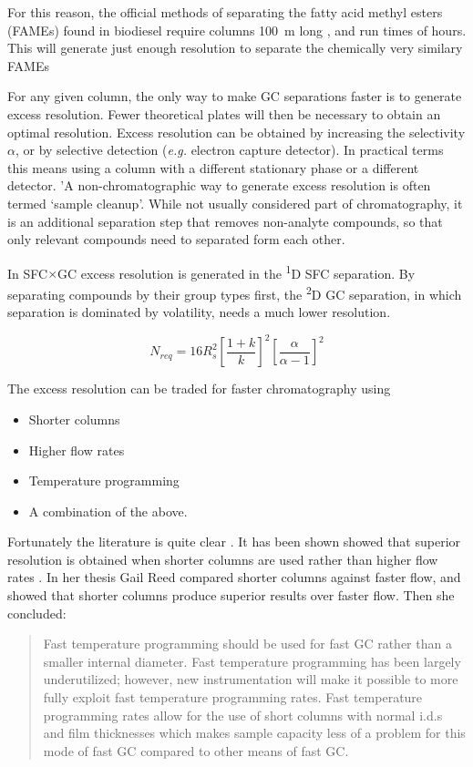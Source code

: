 For this reason, the official methods of separating the fatty acid methyl esters
(FAMEs) found in biodiesel require columns \SI{100}{\metre} long
\autocite{AOCS2017}, and run times of hours. This will generate just enough
resolution to separate the chemically very similary FAMEs

For any given column, the only way to make GC separations faster is to generate
excess resolution. Fewer theoretical plates will then be necessary to obtain an
optimal resolution. Excess resolution can be obtained by increasing the
selectivity $\alpha$, or by selective detection (\textit{e.g.} electron capture
detector). In practical terms this means using a column with a different
stationary phase or a different detector. 'A non-chromatographic way to generate
excess resolution is often termed `sample cleanup'. While not usually considered
part of chromatography, it is an additional separation step that removes
non-analyte compounds, so that only relevant compounds need to
separated form each other. 

In SFC$\times$GC excess resolution is generated in the \textsuperscript{1}D SFC
separation. By separating compounds by their group types first, the
\textsuperscript{2}D GC separation, in which separation is dominated by
volatility, needs a much lower resolution.

\begin{equation} 
N_{req} = 16R^2_s\left[\frac{1+k}{k}\right]^2\left[\frac{\alpha}{\alpha-1}\right]^2
\label{eqn:Nreq}
\end{equation}

The excess resolution can be traded for faster chromatography using 

\begin{itemize}
  \item Shorter columns
  \item Higher flow rates
  \item Temperature programming
  \item A combination of the above.
\end{itemize}

Fortunately the literature is quite clear . It
has been shown showed that superior resolution is obtained when shorter columns
are used rather than higher flow rates \autocite{Klee2002}. In her thesis Gail
Reed \autocite{Reed1999} compared shorter columns against faster flow, and
showed that shorter columns produce superior results over faster flow. Then she
concluded:
\begin{quotation}
Fast temperature programming should be used for fast
GC rather than a smaller internal diameter. Fast temperature programming has been
largely underutilized; however, new instrumentation will make it possible to more fully
exploit fast temperature programming rates. Fast temperature programming rates allow
for the use of short columns with normal i.d.s and film thicknesses which makes sample
capacity less of a problem for this mode of fast GC compared to other means of fast GC.
\end{quotation}

